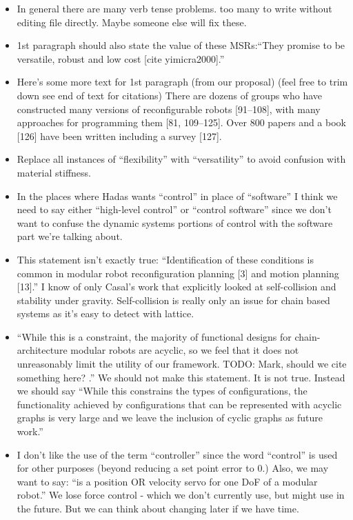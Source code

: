 \documentclass[12pt]{article}
\begin{document}
\begin{itemize}
\item In general there are many verb tense problems. too many to write without editing file directly. Maybe someone else will fix these.
\item 1st paragraph should also state the value of these MSRs:“They promise to be versatile, robust and low cost [cite yimicra2000].”
\item Here’s some more text for 1st paragraph (from our proposal) (feel free to trim down see end of text for citations) There are dozens of groups who have constructed many versions of reconfigurable robots [91–108], with many approaches for programming them [81, 109–125]. Over 800 papers and a book [126] have been written including a survey [127].
\item Replace all instances of “flexibility” with “versatility” to avoid confusion with material stiffness.
\item In the places where Hadas wants “control” in place of “software” I think we need to say either “high-level control” or “control software” since we don’t want to confuse the dynamic systems portions of control with the software part we’re talking about.
\item This statement isn’t exactly true: “Identification of these conditions is common in modular robot reconfiguration planning [3] and motion planning [13].”  I know of only Casal's work that explicitly looked at self-collision and stability under gravity.  Self-collision is really only an issue for chain based systems as it’s easy to detect with lattice.
\item “While this is a constraint, the majority of functional designs for chain-architecture modular robots are acyclic, so we feel that it does not unreasonably limit the utility of our framework. TODO: Mark, should we cite something here? .”
We should not make this statement. It is not true. Instead we should say “While this constrains the types of configurations,  the functionality achieved by configurations that can be represented with acyclic graphs is very large and we leave the inclusion of cyclic graphs as future work.”
\item I don’t like the use of the term “controller” since the word “control” is used for other purposes (beyond reducing a set point error to 0.) Also, we may want to say: “is a position OR velocity servo for one DoF of a modular robot.”  We lose force control - which we don’t currently use, but might use in the future. But we can think about changing later if we have time.

\end{itemize}
\end{document}
